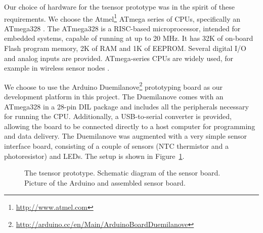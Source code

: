 Our choice of hardware for the tsensor prototype was in the spirit of these requirements. We choose the Atmel\footnote{\url{http://www.atmel.com}} ATmega series of CPUs, specifically an ATmega328 \cite{atmel-atmega-series-2010}. The ATmega328 is a RISC-based microprocessor, intended for embedded systems, capable of running at up to 20 MHz. It has 32K of on-board Flash program memory, 2K of RAM and 1K of EEPROM. Several digital I/O and analog inputs are provided. ATmega-series CPUs are widely used, for example in wireless sensor nodes .

We choose to use the Arduino Duemilanove\footnote{\url{http://arduino.cc/en/Main/ArduinoBoardDuemilanove}} prototyping board as our development platform in this project. The Duemilanove comes with an ATmega328 in a  28-pin DIL package and includes all the peripherals necessary for running the CPU. Additionally, a USB-to-serial converter is provided, allowing the board to be connected directly to a host computer for programming and data delivery.
%
The Duemilanove was augmented with a very simple sensor interface board, consisting of a couple of sensors (NTC thermistor and a photoresistor) and LEDs. The setup is shown in Figure~\ref{fig:tsensor}.
%

\begin{figure}[!t]
\centerline{
} 
\caption{The tsensor prototype. 
 Schematic diagram of the sensor board. 
 Picture of the Arduino and assembled sensor board.}
\label{fig:tsensor}
\end{figure}

